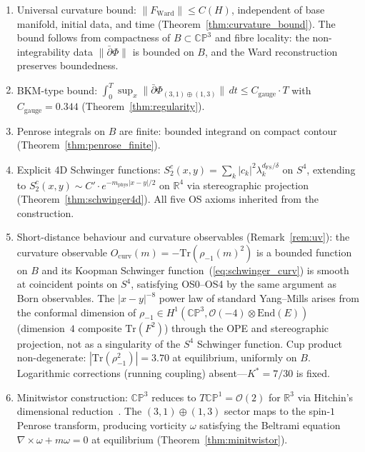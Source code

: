 \documentclass[11pt,a4paper]{article}
\theoremstyle{definition}
\theoremstyle{remark}
\newcommand{\CP}{\mathbb{CP}}
\newcommand{\R}{\mathbb{R}}
\newcommand{\dbar}{\bar{\partial}}
\newcommand{\Tr}{\mathrm{Tr}}
\begin{document}
\begin{enumerate}[nosep]
\item Universal curvature bound: $\|F_{\mathrm{Ward}}\|\leq C(H)$, independent of base manifold, initial data, and time (Theorem~\ref{thm:curvature_bound}). The bound follows from compactness of $B\subset\CP^3$ and fibre locality: the non-integrability data $\|\dbar\Phi\|$ is bounded on $B$, and the Ward reconstruction preserves boundedness.
\item BKM-type bound: $\int_0^T\!\sup_x\|\dbar\Phi_{(3,1)\oplus(1,3)}\|\,dt\leq C_{\mathrm{gauge}}\cdot T$ with $C_{\mathrm{gauge}}=0.344$ (Theorem~\ref{thm:regularity}).
\item Penrose integrals on $B$ are finite: bounded integrand on compact contour (Theorem~\ref{thm:penrose_finite}).
\item Explicit 4D Schwinger functions: $S_2^c(x,y)=\sum_k|c_k|^2\lambda_k^{d_{\mathrm{FS}}/\delta}$ on $S^4$, extending to $S_2^c(x,y)\sim C'\cdot e^{-m_{\mathrm{phys}}|x-y|/2}$ on $\R^4$ via stereographic projection (Theorem~\ref{thm:schwinger4d}). All five OS axioms inherited from the construction.
\item Short-distance behaviour and curvature observables (Remark~\ref{rem:uv}): the curvature observable $O_{\mathrm{curv}}(m)=-\Tr(\rho_{-1}(m)^2)$ is a bounded function on $B$ and its Koopman Schwinger function~(\ref{eq:schwinger_curv}) is smooth at coincident points on $S^4$, satisfying OS0--OS4 by the same argument as Born observables. The $|x-y|^{-8}$ power law of standard Yang--Mills arises from the conformal dimension of $\rho_{-1}\in H^1(\CP^3,\mathcal{O}(-4)\otimes\mathrm{End}(E))$ (dimension~$4$ composite $\Tr(F^2)$) through the OPE and stereographic projection, not as a singularity of the $S^4$ Schwinger function. Cup product non-degenerate: $|\Tr(\rho_{-1}^2)|=3.70$ at equilibrium, uniformly on $B$. Logarithmic corrections (running coupling) absent---$K^*=7/30$ is fixed.
\item Minitwistor construction: $\CP^3$ reduces to $T\CP^1=\mathcal{O}(2)$ for $\R^3$ via Hitchin's dimensional reduction~\cite{Hitchin1982}. The $(3,1)\oplus(1,3)$ sector maps to the spin-$1$ Penrose transform, producing vorticity $\omega$ satisfying the Beltrami equation $\nabla\times\omega+m\omega=0$ at equilibrium (Theorem~\ref{thm:minitwistor}).

\end{enumerate}
\end{document}
